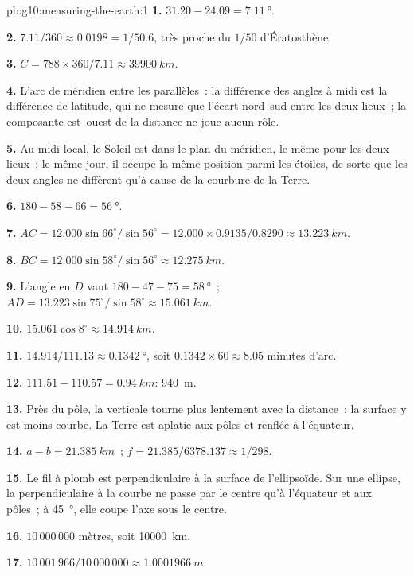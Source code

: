\begin{solution}{pb:g10:measuring-the-earth:1}
\textbf{1.} $31.20 - 24.09 = \qty{7.11}{\degree}$.

\textbf{2.} $7.11/360 \approx 0.0198 = 1/50.6$, très proche du $1/50$
d'Ératosthène.

\textbf{3.} $C = 788 \times 360/7.11 \approx \qty{39900}{km}$.

\textbf{4.} L'arc de méridien entre les parallèles~: la différence des
angles à midi est la différence de latitude, qui ne mesure que l'écart
nord--sud entre les deux lieux~; la composante est--ouest de la distance ne
joue aucun rôle.

\textbf{5.} Au midi local, le Soleil est dans le plan du méridien, le même
pour les deux lieux~; le même jour, il occupe la même position parmi les
étoiles, de sorte que les deux angles ne diffèrent qu'à cause de la
courbure de la Terre.

\textbf{6.} $180 - 58 - 66 = \qty{56}{\degree}$.

\textbf{7.} $AC = 12.000 \sin 66^\circ/\sin 56^\circ = 12.000 \times
0.9135/0.8290 \approx \qty{13.223}{km}$.

\textbf{8.} $BC = 12.000 \sin 58^\circ/\sin 56^\circ \approx \qty{12.275}{km}$.

\textbf{9.} L'angle en $D$ vaut $180 - 47 - 75 = \qty{58}{\degree}$~;
$AD = 13.223 \sin 75^\circ/\sin 58^\circ \approx \qty{15.061}{km}$.

\textbf{10.} $15.061 \cos 8^\circ \approx \qty{14.914}{km}$.

\textbf{11.} $14.914/111.13 \approx \qty{0.1342}{\degree}$, soit
$0.1342 \times 60 \approx 8.05$ minutes d'arc.

\textbf{12.} $111.51 - 110.57 = \qty{0.94}{km}$: \qty{940}{m}.

\textbf{13.} Près du pôle, la verticale tourne plus lentement avec la
distance~: la surface y est moins courbe. La Terre est aplatie aux pôles et
renflée à l'équateur.

\textbf{14.} $a - b = \qty{21.385}{km}$~; $f = 21.385/6378.137 \approx 1/298$.

\textbf{15.} Le fil à plomb est perpendiculaire à la surface de
l'ellipsoïde. Sur une ellipse, la perpendiculaire à la courbe ne passe par
le centre qu'à l'équateur et aux pôles~; à \qty{45}{\degree}, elle coupe
l'axe sous le centre.

\textbf{16.} $10\,000\,000$ mètres, soit \qty{10000}{km}.

\textbf{17.} $10\,001\,966/10\,000\,000 \approx \qty{1.0001966}{m}$.


\end{solution}
